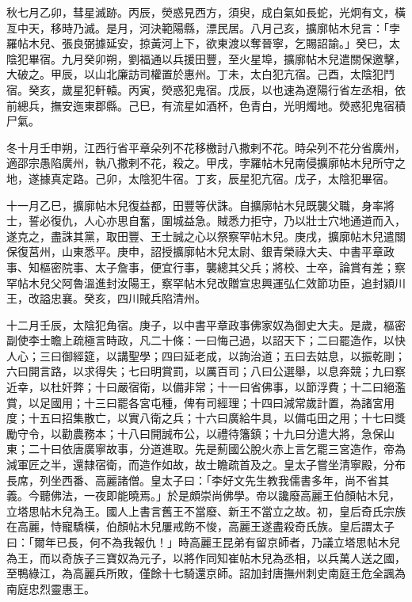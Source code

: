 \begin{pinyinscope}
 秋七月乙卯，彗星滅跡。丙辰，熒惑見西方，須臾，成白氣如長蛇，光炯有文，橫亙中天，移時乃滅。是月，河決範陽縣，漂民居。八月己亥，擴廓帖木兒言：「孛羅帖木兒、張良弼據延安，掠黃河上下，欲東渡以奪晉寧，乞賜詔諭。」癸巳，太陰犯畢宿。九月癸卯朔，劉福通以兵援田豐，至火星埠，擴廓帖木兒遣關保邀擊，大破之。甲辰，以山北廉訪司權置於惠州。丁未，太白犯亢宿。己酉，太陰犯鬥宿。癸亥，歲星犯軒轅。丙寅，熒惑犯鬼宿。戊辰，以也速為遼陽行省左丞相，依前總兵，撫安迤東郡縣。己巳，有流星如酒杯，色青白，光明燭地。熒惑犯鬼宿積尸氣。



 冬十月壬申朔，江西行省平章朵列不花移檄討八撒剌不花。時朵列不花分省廣州，適邵宗愚陷廣州，執八撒剌不花，殺之。甲戌，孛羅帖木兒南侵擴廓帖木兒所守之地，遂據真定路。己卯，太陰犯牛宿。丁亥，辰星犯亢宿。戊子，太陰犯畢宿。



 十一月乙巳，擴廓帖木兒復益都，田豐等伏誅。自擴廓帖木兒既襲父職，身率將士，誓必復仇，人心亦思自奮，圍城益急。賊悉力拒守，乃以壯士穴地通道而入，遂克之，盡誅其黨，取田豐、王士誠之心以祭察罕帖木兒。庚戌，擴廓帖木兒遣關保復莒州，山東悉平。庚申，詔授擴廓帖木兒太尉、銀青榮祿大夫、中書平章政事、知樞密院事、太子詹事，便宜行事，襲總其父兵；將校、士卒，論賞有差；察罕帖木兒父阿魯溫進封汝陽王，察罕帖木兒改贈宣忠興運弘仁效節功臣，追封潁川王，改謚忠襄。癸亥，四川賊兵陷清州。



 十二月壬辰，太陰犯角宿。庚子，以中書平章政事佛家奴為御史大夫。是歲，樞密副使李士瞻上疏極言時政，凡二十條：一曰悔己過，以詔天下；二曰罷造作，以快人心；三曰御經筵，以講聖學；四曰延老成，以詢治道；五曰去姑息，以振乾剛；六曰開言路，以求得失；七曰明賞罰，以厲百司；八曰公選舉，以息奔競；九曰察近幸，以杜奸弊；十曰嚴宿衛，以備非常；十一曰省佛事，以節浮費；十二曰絕濫賞，以足國用；十三曰罷各宮屯種，俾有司經理；十四曰減常歲計置，為諸宮用度；十五曰招集散亡，以實八衛之兵；十六曰廣給牛具，以備屯田之用；十七曰獎勵守令，以勸農務本；十八曰開誠布公，以禮待籓鎮；十九曰分遣大將，急保山東；二十曰依唐廣寧故事，分道進取。先是薊國公脫火赤上言乞罷三宮造作，帝為減軍匠之半，還隸宿衛，而造作如故，故士瞻疏首及之。皇太子嘗坐清寧殿，分布長席，列坐西番、高麗諸僧。皇太子曰：「李好文先生教我儒書多年，尚不省其義。今聽佛法，一夜即能曉焉。」於是頗崇尚佛學。帝以讒廢高麗王伯顏帖木兒，立塔思帖木兒為王。國人上書言舊王不當廢、新王不當立之故。初，皇后奇氏宗族在高麗，恃寵驕橫，伯顏帖木兒屢戒飭不悛，高麗王遂盡殺奇氏族。皇后謂太子曰：「爾年已長，何不為我報仇！」時高麗王昆弟有留京師者，乃議立塔思帖木兒為王，而以奇族子三寶奴為元子，以將作同知崔帖木兒為丞相，以兵萬人送之國，至鴨綠江，為高麗兵所敗，僅餘十七騎還京師。詔加封唐撫州刺史南庭王危全諷為南庭忠烈靈惠王。




\end{pinyinscope}
